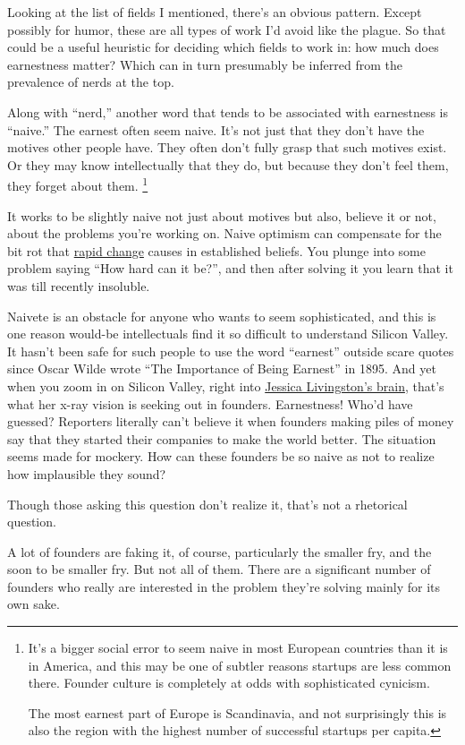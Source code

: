 \documentclass[12pt]{book}
\begin{document}
Looking at the list of fields I mentioned, there's an obvious pattern.
Except possibly for humor, these are all types of work I'd avoid like
the plague. So that could be a useful heuristic for deciding which
fields to work in: how much does earnestness matter? Which can in turn
presumably be inferred from the prevalence of nerds at the top.

Along with ``nerd,'' another word that tends to be associated with
earnestness is ``naive.'' The earnest often seem naive. It's not just
that they don't have the motives other people have. They often don't
fully grasp that such motives exist. Or they may know intellectually
that they do, but because they don't feel them, they forget about them.
\footnote{It's a bigger social error to seem naive in most European
countries than it is in America, and this may be one of subtler reasons
startups are less common there. Founder culture is completely at odds
with sophisticated cynicism.

The most earnest part of Europe is Scandinavia, and not surprisingly
this is also the region with the highest number of successful startups
per capita.}

It works to be slightly naive not just about motives but also, believe
it or not, about the problems you're working on. Naive optimism can
compensate for the bit rot that \href{ecw.html}{rapid change} causes in
established beliefs. You plunge into some problem saying ``How hard can
it be?'', and then after solving it you learn that it was till recently
insoluble.

Naivete is an obstacle for anyone who wants to seem sophisticated, and
this is one reason would-be intellectuals find it so difficult to
understand Silicon Valley. It hasn't been safe for such people to use
the word ``earnest'' outside scare quotes since Oscar Wilde wrote ``The
Importance of Being Earnest'' in 1895. And yet when you zoom in on
Silicon Valley, right into \href{jessica.html}{Jessica Livingston's
brain}, that's what her x-ray vision is seeking out in founders.
Earnestness! Who'd have guessed? Reporters literally can't believe it
when founders making piles of money say that they started their
companies to make the world better. The situation seems made for
mockery. How can these founders be so naive as not to realize how
implausible they sound?

Though those asking this question don't realize it, that's not a
rhetorical question.

A lot of founders are faking it, of course, particularly the smaller
fry, and the soon to be smaller fry. But not all of them. There are a
significant number of founders who really are interested in the problem
they're solving mainly for its own sake.
\end{document}
